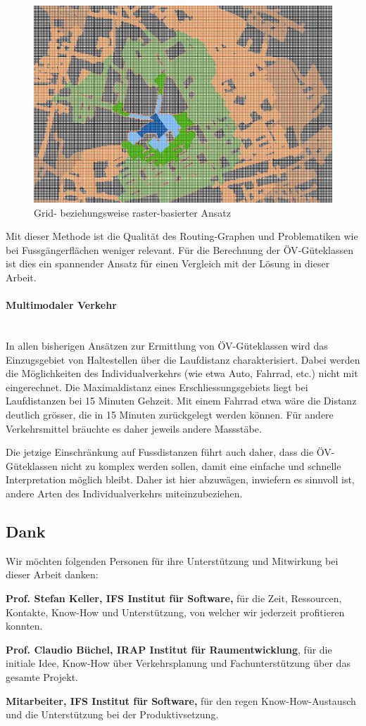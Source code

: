 \begin{figure}[ht]
    \centering
    \includegraphics[width=0.6\linewidth]{start/img/grid_based_approach.png}
    \caption[Grid- beziehungsweise raster-basierter Ansatz]{Grid- beziehungsweise raster-basierter Ansatz~\cite{pedestrian_accessibility_planning}}
    \label{fig:grid_based_approach}
\end{figure}

Mit dieser Methode ist die Qualität des Routing-Graphen und Problematiken wie bei Fussgängerflächen weniger relevant.
Für die Berechnung der \acs{ÖV}-Güteklassen ist dies ein spannender Ansatz für einen Vergleich mit der Lösung in dieser Arbeit.

\paragraph{Multimodaler Verkehr}~\\
In allen bisherigen Ansätzen zur Ermittlung von \acs{ÖV}-Güteklassen wird das Einzugsgebiet von Haltestellen über die Laufdistanz charakterisiert.
Dabei werden die Möglichkeiten des Individualverkehrs (wie etwa Auto, Fahrrad, etc.) nicht mit eingerechnet.
Die Maximaldistanz eines Erschliessungsgebiets liegt bei Laufdistanzen bei 15 Minuten Gehzeit.
Mit einem Fahrrad etwa wäre die Distanz deutlich grösser, die in 15 Minuten zurückgelegt werden können.
Für andere Verkehrsmittel bräuchte es daher jeweils andere Massstäbe.

Die jetzige Einschränkung auf Fussdistanzen führt auch daher, dass die \acs{ÖV}-Güteklassen nicht zu komplex werden sollen, damit eine einfache und schnelle Interpretation möglich bleibt.
Daher ist hier abzuwägen, inwiefern es sinnvoll ist, andere Arten des Individualverkehrs miteinzubeziehen.

\subsection{Dank}
\label{Resultate:Dank}

Wir möchten folgenden Personen für ihre Unterstützung und Mitwirkung bei dieser Arbeit danken:

\textbf{Prof. Stefan Keller, IFS Institut für Software,} für die Zeit, Ressourcen, Kontakte, Know-How und Unterstützung, von welcher wir jederzeit profitieren konnten.

\textbf{Prof. Claudio Büchel, IRAP Institut für Raumentwicklung}, für die initiale Idee, Know-How über Verkehrsplanung und Fachunterstützung über das gesamte Projekt.

\textbf{Mitarbeiter, IFS Institut für Software,} für den regen Know-How-Austausch und die Unterstützung bei der Produktivsetzung.
